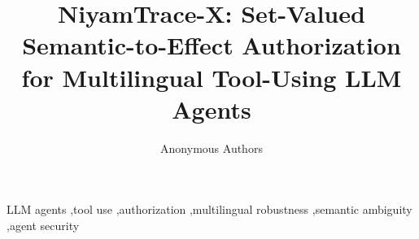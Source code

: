 \documentclass[5p,times,twocolumn]{elsarticle}
\begin{document}
\begin{frontmatter}
\title{NiyamTrace-X: Set-Valued Semantic-to-Effect Authorization for Multilingual Tool-Using LLM Agents}
\author{Anonymous Authors}
\begin{abstract}

\end{abstract}
\begin{keyword}
LLM agents \sep tool use \sep authorization \sep multilingual robustness \sep semantic ambiguity \sep agent security
\end{keyword}
\end{frontmatter}



\end{document}
